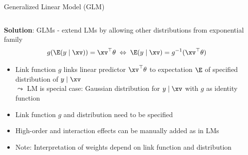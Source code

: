 \documentclass[11pt,compress,t,notes=noshow, aspectratio=169, xcolor=table]{beamer}
\begin{document}
\begin{frame}{Generalized Linear Model (GLM) }
\begin{columns}
\begin{column}{0.4\textwidth}
\begin{center}
        \end{center}
    \end{column}
\end{columns}
\medskip
\pause
\textbf{Solution}: GLMs - extend LMs by allowing other distributions from exponential family
$$g(\E (y \mid \xv)) = \xv^\top \theta \; \Leftrightarrow \; \E (y \mid \xv) = g^{-1}(\xv^\top \theta)$$
\vspace*{-0.5cm}
    \begin{itemize}[<+->]
        \item Link function $g$ links linear predictor $\xv^\top \theta$ to expectation $\E$ of specified distribution of $y \mid \xv$\\
        $\leadsto$ LM is special case: Gaussian distribution for $y \mid \xv$ with $g$ as identity function 
        \item Link function $g$ and distribution need to be specified 
        \item High-order and interaction effects can be manually added as in LMs
        \item Note: Interpretation of weights depend on link function and distribution
    \end{itemize}
\end{frame}
 	
\end{document}
